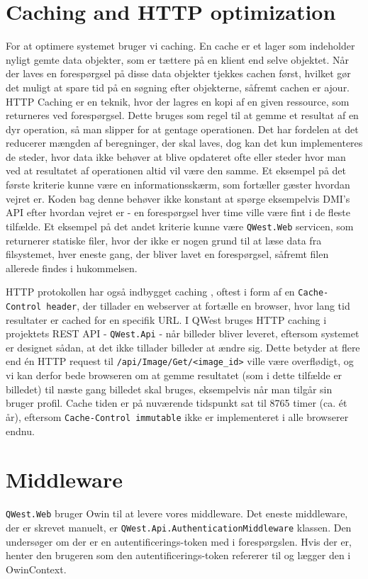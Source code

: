 \section{Caching and HTTP optimization}\label{sec:caching}
For at optimere systemet bruger vi caching. En cache er et lager som indeholder nyligt gemte data objekter, som er tættere på en klient end selve objektet. Når der laves en forespørgsel på disse data objekter tjekkes cachen først, hvilket gør det muligt at spare tid på en søgning efter objekterne, såfremt cachen er ajour. \cite{DistributedSystems}
HTTP Caching er en teknik, hvor der lagres en kopi af en given ressource, som returneres ved forespørgsel. \cite{HTTPcaching} Dette bruges som regel til at gemme et resultat af en dyr operation, så man slipper for at gentage operationen. Det har fordelen at det reducerer mængden af beregninger, der skal laves, dog kan det kun implementeres de steder, hvor data ikke behøver at blive opdateret ofte eller steder hvor man ved at resultatet af operationen altid vil være den samme. 
Et eksempel på det første kriterie kunne være en informationsskærm, som fortæller gæster hvordan vejret er. Koden bag denne behøver ikke konstant at spørge eksempelvis DMI's API efter hvordan vejret er - en forespørgsel hver time ville være fint i de fleste tilfælde. Et eksempel på det andet kriterie kunne være \texttt{QWest.Web} servicen, som returnerer statiske filer, hvor der ikke er nogen grund til at læse data fra filsystemet, hver eneste gang, der bliver lavet en forespørgsel, såfremt filen allerede findes i hukommelsen.

HTTP protokollen har også indbygget caching \cite{HTTPcaching}, oftest i form af en \texttt{Cache-Control header}, der tillader en webserver at fortælle en browser, hvor lang tid resultater er cached for en specifik URL. I QWest bruges HTTP caching i projektets REST API - \texttt{QWest.Api} - når billeder bliver leveret, eftersom systemet er designet sådan, at det ikke tillader billeder at ændre sig. Dette betyder at flere end én HTTP request til \texttt{/api/Image/Get/<image\_id>} ville være overflødigt, og vi kan derfor bede browseren om at gemme resultatet (som i dette tilfælde er billedet) til næste gang billedet skal bruges, eksempelvis når man tilgår sin bruger profil. Cache tiden er på nuværende tidspunkt sat til 8765 timer (ca. ét år), eftersom \texttt{Cache-Control immutable} ikke er implementeret i alle browserer endnu.

\section{Middleware}\label{sec:middleware}
\texttt{QWest.Web} bruger Owin \cite{Owin} til at levere vores middleware. Det eneste middleware, der er skrevet manuelt, er \texttt{QWest.Api.AuthenticationMiddleware} klassen. Den undersøger om der er en autentificerings-token med i forespørgslen. Hvis der er, henter den brugeren som den autentificerings-token refererer til og lægger den i OwinContext. 